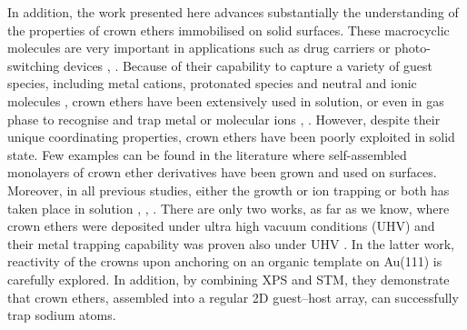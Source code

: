 \documentclass[aps,prl,reprint,longbibliography,superscriptaddress, english]{revtex4-1}
\begin{document}
In addition, the work presented here advances substantially the understanding of the properties of crown ethers immobilised on solid surfaces. 
These macrocyclic molecules are very important in applications such as drug carriers \cite{uchegbu_non-ionic_1998} or photo-switching devices \cite{malval_photoswitching_2002}, \cite{uda_membrane_2005}. Because of their capability to capture a variety of guest species, including metal cations, protonated species and neutral and ionic molecules \cite{dobler1981ionophores}, crown ethers \cite{gokel_crown_1991} have been extensively used in solution, or even in gas phase to recognise and trap metal or molecular ions \cite{more_intrinsic_1999}, \cite{maleknia_cavity-size-dependent_2002}. However, despite their unique coordinating properties, crown ethers have been poorly exploited in solid state. Few examples can be found in the literature where self-assembled monolayers of crown ether derivatives have been grown and used on surfaces. Moreover, in all previous studies, either the growth or ion trapping or both has taken place in solution \cite{yoshimoto_hostguest_2003}, \cite{flink_recognition_1999}, \cite{inokuchi_new_2015}. 
 There are only two works, as far as we know, where crown ethers were deposited under ultra high vacuum conditions (UHV) \cite{feng_growth_2018} and their metal trapping capability was proven also under UHV \cite{stredansky_-surface_2019}. In the latter work, reactivity of the crowns upon anchoring on an organic template on Au(111) is carefully explored. In addition, by combining XPS and STM, they demonstrate that crown ethers, assembled into a regular 2D guest--host array, can successfully trap sodium atoms.

\end{document}
